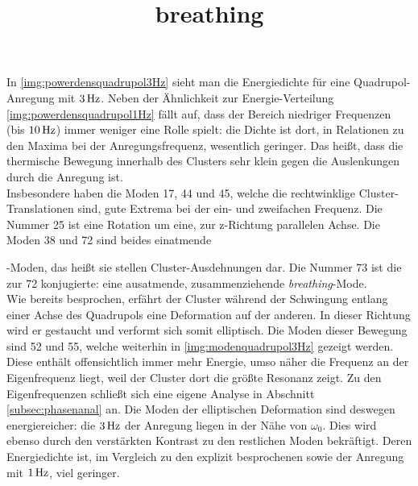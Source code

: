 \documentclass[numbers=noenddot,a4paper,notitlepage,twoside,BCOR15mm]{scrbook}
\newcommand{\ix}[1]{_\text{#1}}
\newcommand{\tilt}[1]{\textit{#1}}
\begin{document}
						In \ref{img:powerdensquadrupol3Hz} sieht man die Energiedichte für eine Quadrupol-Anregung mit $\unit[3]{Hz}$. Neben der Ähnlichkeit zur Energie-Verteilung \ref{img:powerdensquadrupol1Hz} fällt auf, dass der Bereich niedriger Frequenzen (bis $\unit[10]{Hz}$) immer weniger eine Rolle spielt: die Dichte ist dort, in Relationen zu den Maxima bei der Anregungsfrequenz, wesentlich geringer. Das heißt, dass die thermische Bewegung innerhalb des Clusters sehr klein gegen die Auslenkungen durch die Anregung ist.\\
						Insbesondere haben die Moden 17, 44 und 45, welche die rechtwinklige Cluster-Translationen sind, gute Extrema bei der ein- und zweifachen Frequenz. Die Nummer 25 ist eine Rotation um eine, zur z-Richtung parallelen Achse. Die Moden 38 und 72 sind beides einatmende \title{breathing}-Moden, das heißt sie stellen Cluster-Ausdehnungen dar. Die Nummer 73 ist die zur 72 konjugierte: eine ausatmende, zusammenziehende \tilt{breathing}-Mode.\\
						Wie bereits besprochen, erfährt der Cluster während der Schwingung entlang einer Achse des Quadrupols eine Deformation auf der anderen. In dieser Richtung wird er gestaucht und verformt sich somit elliptisch.  Die Moden dieser Bewegung sind 52 und 55, welche weiterhin in \ref{img:modenquadrupol3Hz} gezeigt werden. Diese enthält offensichtlich immer mehr Energie, umso näher die Frequenz an der Eigenfrequenz liegt, weil der Cluster dort die größte Resonanz zeigt. Zu den Eigenfrequenzen schließt sich eine eigene Analyse in Abschnitt \ref{subsec:phasenanal} an. Die Moden der elliptischen Deformation sind deswegen energiereicher: die $\unit[3]{Hz}$ der Anregung liegen in der Nähe von $\omega\ix{0}$. Dies wird ebenso durch den verstärkten Kontrast zu den restlichen Moden bekräftigt. Deren Energiedichte ist, im Vergleich zu den explizit besprochenen sowie der Anregung mit $\unit[1]{Hz}$, viel geringer.
\end{document}
